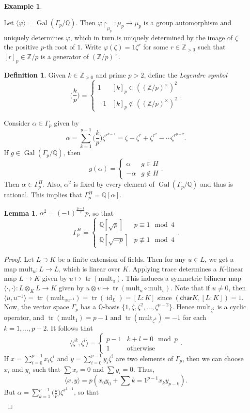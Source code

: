 \documentclass[10pt,letterpaper,cm]{nupset}
\theoremstyle{definition}
\newtheorem*{definition}{Definition}
\newtheorem{exmp}{Example}
\newtheorem{lemma}{Lemma}
\newcommand{\Q}{\mathbb Q}
\newcommand{\Z}{\mathbb Z}
\newcommand{\1}{\mathbf{1}}
\newcommand{\0}{\vec 0}
\newcommand{\Char}{\mathsf{char}}
\DeclareMathOperator{\id}{id}
\DeclareMathOperator{\gal}{Gal}
\DeclareMathOperator{\tr}{tr}
\begin{document}
\begin{exmp}
\begin{enumerate}
Let $\langle \varphi \rangle = \gal(\Gamma_p /\Q)$. Then $\varphi \restriction_{\mu_p} : \mu_p \to \mu_p$ is a group automorphism and  uniquely determines $\varphi$, which in turn is uniquely determined by the image of $\zeta$ the positive $p$-th root of $1$. Write $\varphi(\zeta) = 1\zeta^r$ for some $r \in \Z_{>0}$ such that $[r]_p \in \Z/p$ is a generator of $(\Z/p)^{\times}$. 
\begin{definition}
Given $k \in \Z_{>0}$ and prime $p>2$, define the \textit{Legendre symbol} $$\big (\frac{k}{p} \big) = \begin{cases}    1 & [k]_p \in ((\Z/p)^{\times})^2 \\ {-}1 & [k]_p \notin  ((\Z/p)^{\times})^2  \end{cases}.$$
\end{definition}
Consider $\alpha \in \Gamma_p$ given by $$  \alpha = \sum_{k=1}^{p-1} \big (\frac{k}{p} \big) \zeta^{r^{k-1}} = \zeta - \zeta^r + \zeta^{r^2} - \cdots \zeta^{r^{p-2}}   .$$ If $g\in \gal(\Gamma_p /\Q)$, then $$ g(\alpha) = \begin{cases}  \alpha & g \in H \\ {-}\alpha & g \notin H   \end{cases} . $$ Then $\alpha \in \Gamma_p^H$. Also, $\alpha^2$ is fixed by every element of $\gal(\Gamma_p/\Q)$ and thus is rational. This implies that $\Gamma_p^H = \Q[\alpha]$.
\begin{lemma}
$\alpha^2 = ({-}1)^{\frac{p-1}{2}}p$, so that $$\Gamma_p^H = \begin{cases} \Q[\sqrt{p}] & p \equiv 1 \mod 4 \\ \Q[\sqrt{{-}p}] & p \not \equiv 1 \mod 4   \end{cases}.$$
\end{lemma}
\begin{proof}
Let $L \supset K$ be a finite extension of fields. Then for any $u\in L$, we get a map $\text{mult}_u : L \to L$, which is linear over $K$. Applying trace determines a $K$-linear map $L \to K$ given by $u \mapsto \tr(\text{mult}_u)$. This induces a symmetric bilinear map $\langle \cdot, \cdot \rangle : L \otimes_K L \to K$ given by $u \otimes v \mapsto \tr(\text{mult}_u \circ \text{mult}_v)$. Note that if $u \ne 0$, then $\langle u, u^{-1} \rangle = \tr(\text{mult}_{uu^{-1}}) = \tr(\id_L) =[L:K] $ since $(\Char{K}, [L:K])=1$. Now, the vector space $\Gamma_p$ has a $\Q$-basis $\{1, \zeta, \zeta^2, \ldots, \zeta^{p-2}\}$. Hence $\text{mult}_{\zeta^2}$ is a cyclic operator, and $\tr(\text{mult}_1) = p-1$ and $\tr(\text{mult}_{\zeta^k}) = {-1}$ for each $k=1, \ldots, p-2$. It follows that $$ \langle \zeta^k, \zeta^l \rangle = \begin{cases}  p-1 & k+l \equiv 0 \mod p \\ 1 & \text{otherwise}   \end{cases}.$$ If $x = \sum_{i=0}^{p-1} x_i \zeta^i$ and $y = \sum_{i=0}^{p-1} y_i \zeta^i$ are two elements of $\Gamma_p$, then we can choose $x_i$ and $y_i$ such that $\sum x_i = 0$ and $\sum y_i= 0$. Thus, $$\langle x, y \rangle = p(x_0y_0 + \sum{k=1}^{p-1} x_k y_{p-k}).$$ But $\alpha = \sum_{k=1}^{p-1} \big (\frac{k}{p} \big) \zeta^{r^{k-1}}$, so that \begin{align*}

\end{align*}
\end{proof}
\end{enumerate}
\end{exmp}
\end{document}
